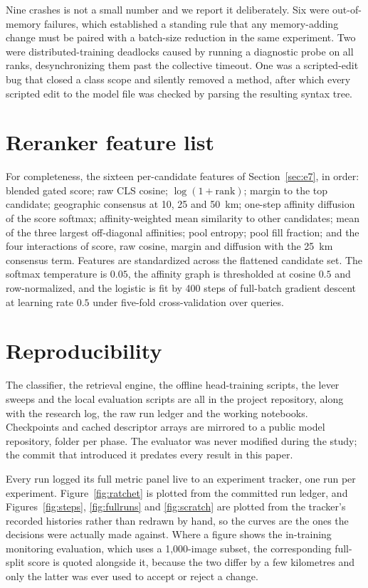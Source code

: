 \documentclass[11pt,a4paper]{article}
\begin{document}
Nine crashes is not a small number and we report it deliberately. Six were out-of-memory
failures, which established a standing rule that any memory-adding change must be paired with
a batch-size reduction in the same experiment. Two were distributed-training deadlocks caused
by running a diagnostic probe on all ranks, desynchronizing them past the collective timeout.
One was a scripted-edit bug that closed a class scope and silently removed a method, after
which every scripted edit to the model file was checked by parsing the resulting syntax tree.

\section{Reranker feature list}

For completeness, the sixteen per-candidate features of Section~\ref{sec:e7}, in order:
blended gated score; raw CLS cosine; $\log(1+\mathrm{rank})$; margin to the top candidate;
geographic consensus at 10, 25 and 50~km; one-step affinity diffusion of the score softmax;
affinity-weighted mean similarity to other candidates; mean of the three largest off-diagonal
affinities; pool entropy; pool fill fraction; and the four interactions of score, raw cosine,
margin and diffusion with the 25~km consensus term. Features are standardized across the
flattened candidate set. The softmax temperature is $0.05$, the affinity graph is thresholded
at cosine $0.5$ and row-normalized, and the logistic is fit by 400 steps of full-batch
gradient descent at learning rate $0.5$ under five-fold cross-validation over queries.

\section{Reproducibility}

The classifier, the retrieval engine, the offline head-training scripts, the lever sweeps and
the local evaluation scripts are all in the project repository, along with the research log,
the raw run ledger and the working notebooks. Checkpoints and cached descriptor arrays are
mirrored to a public model repository, folder per phase. The evaluator was never modified
during the study; the commit that introduced it predates every result in this paper.

Every run logged its full metric panel live to an experiment tracker, one run per experiment.
Figure~\ref{fig:ratchet} is plotted from the committed run ledger, and
Figures~\ref{fig:steps}, \ref{fig:fullruns} and \ref{fig:scratch} are plotted from the
tracker's recorded histories rather than redrawn by hand, so the curves are the ones the
decisions were actually made against. Where a figure shows the in-training monitoring
evaluation, which uses a 1{,}000-image subset, the corresponding full-split score is quoted
alongside it, because the two differ by a few kilometres and only the latter was ever used to
accept or reject a change.
\end{document}

